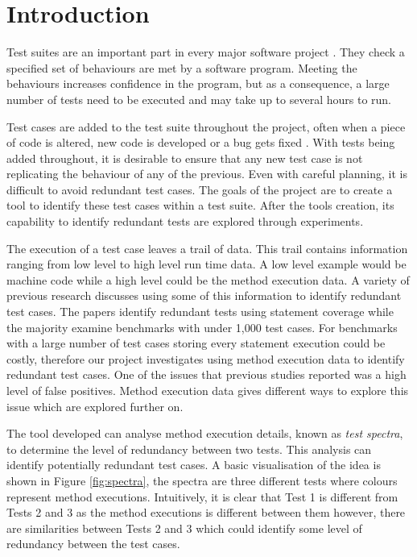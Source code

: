 \chapter{Introduction}\label{C:intro}

Test suites are an important part in every major software project \cite{jeffrey2005test}. They check a specified set of behaviours are met by a software program. Meeting the behaviours increases confidence in the program, but as a consequence, a large number of tests need to be executed and may take up to several hours to run.

Test cases are added to the test suite throughout the project, often when a piece of code is altered, new code is developed or a bug gets fixed \cite{issuetrack,whentotest}. With tests being added throughout, it is desirable to ensure that any new test case is not replicating the behaviour of any of the previous. Even with careful planning, it is difficult to avoid redundant test cases. The goals of the project are to create a tool to identify these test cases within a test suite. After the tools creation, its capability to identify redundant tests are explored through experiments.


The execution of a test case leaves a trail of data. This trail contains information ranging from low level to high level run time data. A low level example would be machine code while a high level could be the method execution data. A variety of previous research \cite{wong1995effect, wong1999test, rothermel1998empirical, rothermel2002empirical,koochakzadeh2009test,zhang2011empirical,li2008static} discusses using some of this information to identify redundant test cases. The papers identify redundant tests using statement coverage while the majority examine benchmarks with under 1,000 test cases. For benchmarks with a large number of test cases storing every statement execution could be costly, therefore our project investigates using method execution data to identify redundant test cases. One of the issues that previous studies reported was a high level of false positives. Method execution data gives different ways to explore this issue which are explored further on. 

The tool developed can analyse method execution details, known as \textit{test spectra}, to determine the level of redundancy between two tests. This analysis can identify potentially redundant test cases. A basic visualisation of the idea is shown in Figure \ref{fig:spectra}, the spectra are three different tests where colours represent method executions. Intuitively, it is clear that Test 1 is different from Tests 2 and 3 as the method executions is different between them however, there are similarities between Tests 2 and 3 which could identify some level of redundancy between the test cases. 

